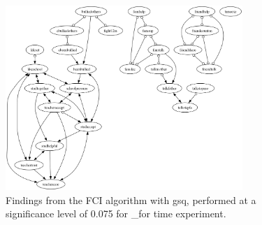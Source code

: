 \begin{figure}[htbp]
    \centering
    \includegraphics[width=0.8\textwidth]{Report/final_report/pictures/FCI_gsq_0.075__for time experiment.png}
    \caption{Findings from the FCI algorithm with gsq, performed at a significance level of 0.075 for _for time experiment.}
    \label{fig:fci_gsq_0.075_for time experiment}
\end{figure}
